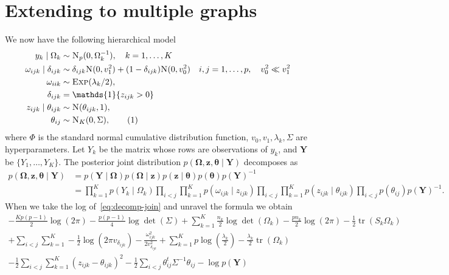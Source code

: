 \documentclass[a4paper, 11pt, oneside]{report}
\DeclareMathOperator{\tr}{tr}
\newcommand{\1}{\mathds{1}}
\newcommand{\inv}{^{-1}}
\newcommand{\Np}{\textsc{N}_p}
\newcommand{\Nor}{\textsc{N}}
\newcommand{\Exp}{\textsc{Exp}}
\newcommand{\bOmega}{\mathbf{\Omega}}
\newcommand{\bz}{\mathbf{z}}
\newcommand{\btheta}{\mathbf{\theta}}
\newcommand{\bY}{\mathbf{Y}}
\begin{document}
\chapter{Extending to multiple graphs}\label{chap:multigraph}
We now have the following hierarchical model
\begin{align*}
	y_k \mid \Omega_k              & \sim \Np(0, \Omega_k^{-1}), \quad k=1,\dots,K                                                                     \\
	\omega_{ijk} \mid \delta_{ijk} & \sim \delta_{ijk} \Nor(0, v_1^2) + (1 - \delta_{ijk}) \Nor(0, v_0^2) \quad i,j = 1,\dots,p, \quad v_0^2 \ll v_1^2 \\
	\omega_{iik}                   & \sim \Exp(\lambda_k/2),                                                                                           \\
	\delta_{ijk}                   & = \1\{z_{ijk} > 0\}                                                                                               \\
	z_{ijk} \mid \theta_{ijk}      & \sim \Nor(\theta_{ijk}, 1),                                                                                       \\
	\theta_{ij}                    & \sim \textsc{N}_K(0, \Sigma),\stepcounter{equation}\tag{\theequation}\label{eq:mg-model}
\end{align*}
where $\Phi$ is the standard normal cumulative distribution function, $v_0,
	v_1, \lambda_k, \Sigma$ are hyperparameters.
Let $Y_k$ be the matrix whose rows are observations of $y_k$, and $\mathbf{Y}$
be $\{Y_1,\dots,Y_K\}$.
The posterior joint distribution $p(\mathbf{\Omega},  \mathbf{z},
	\mathbf{\theta} \mid \mathbf{Y})$ decomposes as
\begin{align}\label{eq:decomp-join}
	p(\bOmega,  \bz, \btheta \mid \bY) & = p(\bY \mid \bOmega) p(\bOmega \mid \bz)
	p(\bz \mid \btheta) p(\btheta) p(\bY)\inv \nonumber                            \\
	                                   & = \prod_{k=1}^K p(Y_k \mid \Omega_k)
	\prod_{i < j}\prod_{k=1}^K p(\omega_{ijk}
	\mid z_{ijk}) \prod_{i < j}\prod_{k=1}^K
	p(z_{ijk} \mid \theta_{ijk})\prod_{i <
		j} p(\theta_{ij}) p(\bY)\inv.
\end{align}
When we take the log of~\ref{eq:decomp-join} and unravel the formula we obtain
\begin{multline}\label{eq:mg-joint}
	- \frac{Kp(p-1)}{2} \log(2\pi) - \frac{p(p-1)}{4} \log\det(\Sigma) + \sum_{k=1}^K \frac{n_k}{2} \log\det(\Omega_k) - \frac{p n_k}{2} \log(2 \pi) -\frac{1}{2} \tr(S_k \Omega_k) \\
	+ \sum_{i < j}\sum_{k=1}^K -\frac{1}{2} \log(2 \pi v_{\delta_{ijk}}) - \frac{\omega_{ijk}^2}{2 v_{\delta_{ijk}}^2} + \sum_{k=1}^K p \log\left(\frac{\lambda_k}{2}\right) - \frac{\lambda_k}{2} \tr(\Omega_k)  \\
	-\frac{1}{2} \sum_{i < j}\sum_{k=1}^K (z_{ijk} - \theta_{ijk})^2  -\frac{1}{2} \sum_{i < j} \theta_{ij}^t \Sigma\inv \theta_{ij} - \log p(\bY)
\end{multline}
\end{document}
